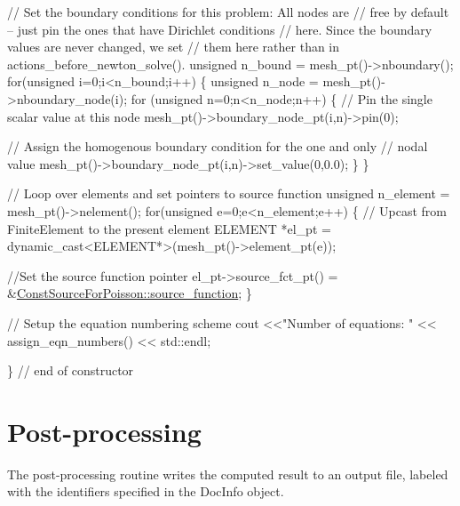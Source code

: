 \begin{DoxyCodeInclude}
 \textcolor{comment}{// Set the boundary conditions for this problem: All nodes are}
 \textcolor{comment}{// free by default -- just pin the ones that have Dirichlet conditions}
 \textcolor{comment}{// here. Since the boundary values are never changed, we set}
 \textcolor{comment}{// them here rather than in actions\_before\_newton\_solve(). }
 \textcolor{keywordtype}{unsigned} n\_bound = mesh\_pt()->nboundary();
 \textcolor{keywordflow}{for}(\textcolor{keywordtype}{unsigned} i=0;i<n\_bound;i++)
  \{
   \textcolor{keywordtype}{unsigned} n\_node = mesh\_pt()->nboundary\_node(i);
   \textcolor{keywordflow}{for} (\textcolor{keywordtype}{unsigned} n=0;n<n\_node;n++)
    \{
     \textcolor{comment}{// Pin the single scalar value at this node}
     mesh\_pt()->boundary\_node\_pt(i,n)->pin(0); 

     \textcolor{comment}{// Assign the homogenous boundary condition for the one and only}
     \textcolor{comment}{// nodal value}
     mesh\_pt()->boundary\_node\_pt(i,n)->set\_value(0,0.0); 
    \}
  \}

 \textcolor{comment}{// Loop over elements and set pointers to source function}
 \textcolor{keywordtype}{unsigned} n\_element = mesh\_pt()->nelement();
 \textcolor{keywordflow}{for}(\textcolor{keywordtype}{unsigned} e=0;e<n\_element;e++)
  \{
   \textcolor{comment}{// Upcast from FiniteElement to the present element}
   ELEMENT *el\_pt = \textcolor{keyword}{dynamic\_cast<}ELEMENT*\textcolor{keyword}{>}(mesh\_pt()->element\_pt(e));

   \textcolor{comment}{//Set the source function pointer}
   el\_pt->source\_fct\_pt() = &\hyperlink{namespaceConstSourceForPoisson_aeaa1153817bde9598372b803342f3299}{ConstSourceForPoisson::source\_function};
  \}

 \textcolor{comment}{// Setup the equation numbering scheme}
 cout <<\textcolor{stringliteral}{"Number of equations: "} << assign\_eqn\_numbers() << std::endl; 

\} \textcolor{comment}{// end of constructor}

\end{DoxyCodeInclude}




 

\hypertarget{index_doc}{}\section{Post-\/processing}\label{index_doc}
The post-\/processing routine writes the computed result to an output file, labeled with the identifiers specified in the {\ttfamily Doc\+Info} object.


